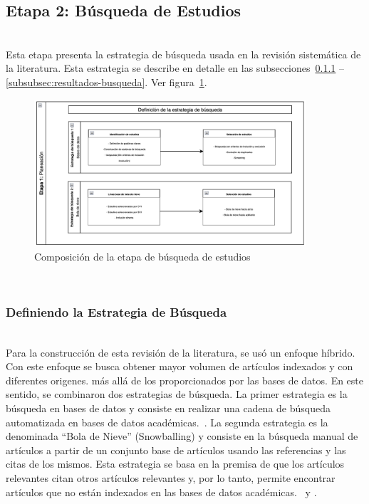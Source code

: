 \subsection{Etapa 2: Búsqueda de Estudios}
\mbox{}\\
Esta etapa presenta la estrategia de búsqueda usada en la revisión sistemática de la literatura. Esta estrategia se describe en detalle en las subsecciones~\ref{subsubsec:Definiendo la Estrategia de Busqueda} -- \ref{subsubsec:resultados-busqueda}. Ver figura~\ref{fig:etapa2}.
\begin{figure}[tbp]
    \centering
    \includegraphics[width=0.9\textwidth,height=0.3\textheight]{resources/images/planeacion/estrategias-busqueda.png}
    \caption{Composición de la etapa de búsqueda de estudios}\label{fig:etapa2}
\end{figure}
\mbox{}\\

\subsubsection{Definiendo la Estrategia de Búsqueda}\label{subsubsec:Definiendo la Estrategia de Busqueda}
\mbox{}\\
Para la construcción de esta revisión de la literatura, se usó un enfoque híbrido. Con este enfoque se busca obtener mayor volumen de artículos indexados y con diferentes origenes. más allá de los proporcionados por las bases de datos.
En este sentido, se combinaron dos estrategias de búsqueda. La primer estrategia es la búsqueda en bases de datos y consiste en realizar una cadena de búsqueda automatizada en bases de datos académicas.~\cite{jalali2012systematic}.
La segunda estrategia es la denominada ``Bola de Nieve'' (Snowballing) y consiste en la búsqueda manual de artículos a partir de un conjunto base de artículos usando las referencias y las citas de los mismos. Esta estrategia se basa en la premisa de que los artículos relevantes citan otros artículos relevantes y, por lo tanto, permite encontrar artículos que no están indexados en las bases de datos académicas.~\cite{jalali2012systematic} y \cite{goodman1961snowball}.
\mbox{}\\

